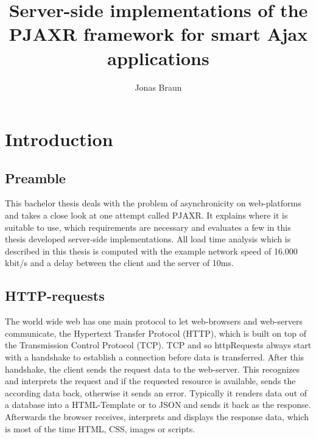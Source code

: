 \documentclass[f,bachelor,binding,twoside,palatino]{WeSTthesis}
\author{Jonas Braun}
\title{Server-side implementations of the PJAXR framework for smart Ajax applications}
\begin{document}

\maketitle %

\tableofcontents

\varclearpage



\section{Introduction}
  \subsection{Preamble}
  This bachelor thesis deals with the problem of asynchronicity on web-platforms and takes a close look at one attempt called \gls{PJAXR}.
  It explains where it is suitable to use, which requirements are necessary and evaluates a few in this thesis developed server-side implementations.
  All load time analysis which is described in this thesis is computed with the example network speed of 16.000 kbit/s and a delay between the client and the server of 10ms.
  

  \subsection{HTTP-requests}
    The world wide web has one main protocol to let web-browsers and web-servers communicate, the Hypertext Transfer Protocol (HTTP), which is built on top of the Transmission Control Protocol (TCP).
    TCP and so \gls{httpRequest}s always start with a handshake to establish a connection before data is transferred.
    After this handshake, the client sends the request data to the web-server.
    This recognizes and interprets the request and if the requested resource is available, sends the according data back, otherwise it sends an error.
    Typically it renders data out of a database into a HTML-Template or to JSON and sends it back as the response.
	Afterwards the browser receives, interprets and displays the response data, which is most of the time HTML, CSS, images or scripts.
\end{document}
